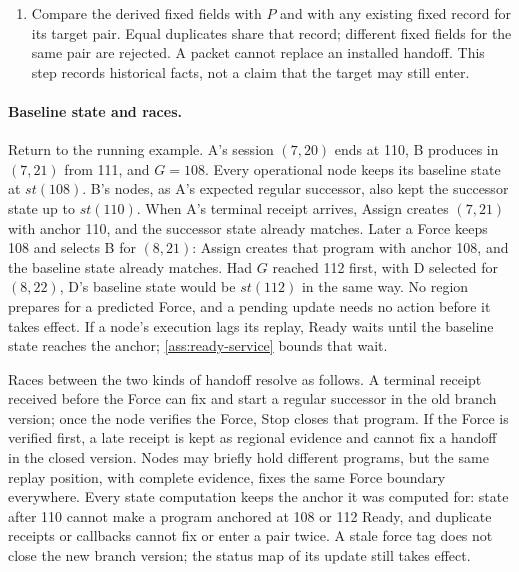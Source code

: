 \documentclass[11pt,a4paper]{article}
\begin{document}
\begin{enumerate}[label=(\roman*),itemsep=2pt]
authority. Check the target region and the immutable target authority.
Set $q^{\rm open}_{\beta',r'}=q_s$, and set $\lambda^{\rm open}_{\beta',r'}$
to the maximum of the anchor's L1 reference height and the initial
authority's publication height. Validate the anchor's original direct or
covering commitment evidence under \cref{sec:coverage,sec:receipt-kernel},
together with its complete block and required ancestry. Do not relabel
it with the target pair.
\item Compare the derived fixed fields with $P$ and with any existing
fixed record for its target pair. Equal duplicates share that record;
different fixed fields for the same pair are rejected. A packet cannot
replace an installed handoff. This step records historical facts, not a
claim that the target may still enter.
\end{enumerate}


\paragraph{Baseline state and races.}
\label{sec:runtime-races}
Return to the running example. A's session $(7,20)$ ends at 110, B
produces in $(7,21)$ from 111, and $G=108$. Every operational node keeps
its baseline state at $\mathit{st}(108)$. B's nodes, as A's expected
regular successor, also kept the successor state up to $\mathit{st}(110)$.
When A's terminal receipt arrives, Assign creates $(7,21)$ with anchor 110,
and the successor state already matches. Later a Force keeps 108 and
selects B for $(8,21)$: Assign creates that program with anchor 108, and
the baseline state already matches. Had $G$ reached 112 first, with D
selected for $(8,22)$, D's baseline state would be $\mathit{st}(112)$ in
the same way. No
region prepares for a predicted Force, and a pending update needs no
action before it takes effect. If a node's execution lags its replay,
Ready waits until the baseline state reaches the anchor; \cref{ass:ready-service}
bounds that wait.

Races between the two kinds of handoff resolve as follows. A terminal
receipt received before the Force can fix and start a regular successor
in the old branch version; once the node verifies the Force, Stop closes
that program. If the Force is verified first, a late receipt is kept as
regional evidence and cannot fix a handoff in the closed version. Nodes
may briefly hold different programs, but the same replay position, with
complete evidence, fixes the same Force boundary everywhere. Every state
computation keeps the anchor it was computed for: state after 110
cannot make a program anchored at 108 or 112 Ready, and duplicate
receipts or callbacks cannot fix or enter a pair twice. A stale force
tag does not close the new branch version; the status map of its update
still takes effect.
\end{document}
